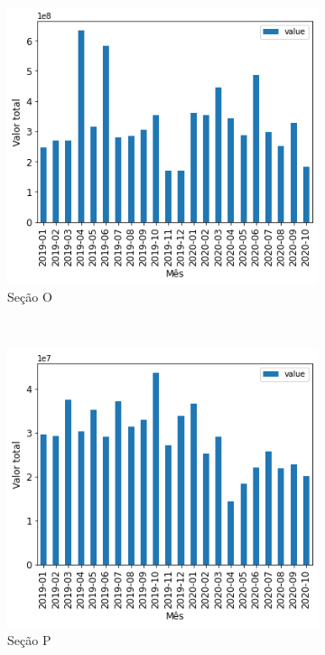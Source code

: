 \begin{figure}[htb]
\begin{subfigure}[b]{0.45\textwidth}
    \end{subfigure} ~ \\
    \begin{subfigure}[b]{0.45\textwidth}
        \includegraphics[scale=0.45]{images/base-de-dados-16.O-valor-mensal-por-secao.png}
        \caption{Seção O}
        \label{fig:pandemia:descritiva-16.O-valor-mensal-por-secao}
    \end{subfigure} ~ \quad
    \begin{subfigure}[b]{0.45\textwidth}
        \includegraphics[scale=0.45]{images/base-de-dados-16.P-valor-mensal-por-secao.png}
        \caption{Seção P}
        \label{fig:pandemia:descritiva-16.P-valor-mensal-por-secao}
    \end{subfigure} ~ \\
    \begin{subfigure}[b]{0.45\textwidth} 

\end{subfigure}
\end{figure}

